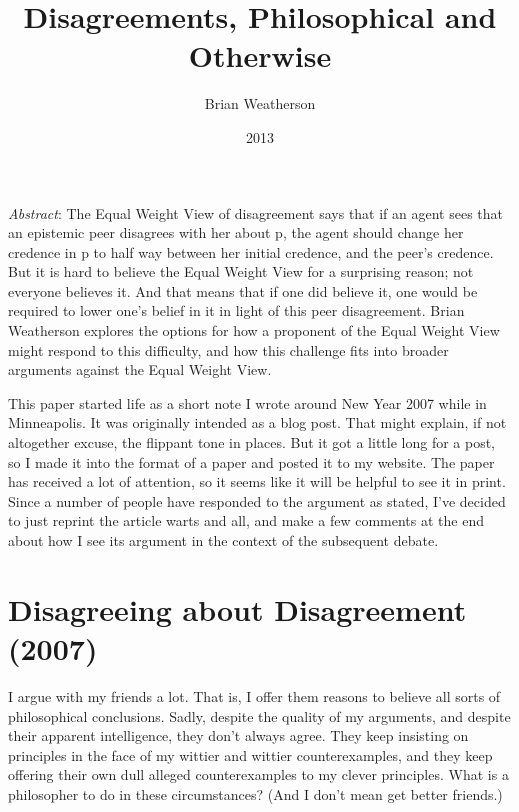 \documentclass[
  11pt,
  letterpaper,
  DIV=11,
  numbers=noendperiod,
  twoside]{scrartcl}
\title{Disagreements, Philosophical and Otherwise}
\author{Brian Weatherson}
\date{2013}
\renewenvironment{abstract}
 {\vspace{-1.25cm}
 \quotation\small\noindent\emph{Abstract}:}
 {\endquotation}
\begin{document}
\maketitle
\begin{abstract}
The Equal Weight View of disagreement says that if an agent sees that an
epistemic peer disagrees with her about p, the agent should change her
credence in p to half way between her initial credence, and the peer's
credence. But it is hard to believe the Equal Weight View for a
surprising reason; not everyone believes it. And that means that if one
did believe it, one would be required to lower one's belief in it in
light of this peer disagreement. Brian Weatherson explores the options
for how a proponent of the Equal Weight View might respond to this
difficulty, and how this challenge fits into broader arguments against
the Equal Weight View.
\end{abstract}


This paper started life as a short note I wrote around New Year 2007
while in Minneapolis. It was originally intended as a blog post. That
might explain, if not altogether excuse, the flippant tone in places.
But it got a little long for a post, so I made it into the format of a
paper and posted it to my website. The paper has received a lot of
attention, so it seems like it will be helpful to see it in print. Since
a number of people have responded to the argument as stated, I've
decided to just reprint the article warts and all, and make a few
comments at the end about how I see its argument in the context of the
subsequent debate.

\section*{Disagreeing about Disagreement
(2007)}\label{disagreeing-about-disagreement-2007}

I argue with my friends a lot. That is, I offer them reasons to believe
all sorts of philosophical conclusions. Sadly, despite the quality of my
arguments, and despite their apparent intelligence, they don't always
agree. They keep insisting on principles in the face of my wittier and
wittier counterexamples, and they keep offering their own dull alleged
counterexamples to my clever principles. What is a philosopher to do in
these circumstances? (And I don't mean get better friends.)
\end{document}
